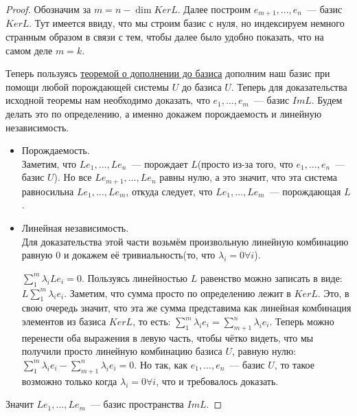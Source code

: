 \begin{proof}
    Обозначим за $m=n - \dim Ker L$.
    Далее построим $e_{m+1},\dots, e_n$~--- базис $Ker L$.
    Тут имеется ввиду, что мы строим базис с нуля, но индексируем немного странным
    образом в связи с тем, чтобы далее было удобно показать, что на самом деле $m = k$.

    Теперь пользуясь \hyperref[thm:О дополнении до базиса]{теоремой о дополнении до базиса}
    дополним наш базис
    при помощи любой порождающей системы $U$ до базиса $U$. Теперь для доказательства
    исходной теоремы нам необходимо доказать, что $e_1,\dots, e_m$~--- базис $Im L$.
    Будем делать это по определению, а именно докажем порождаемость и линейную независимость.

    \begin{itemize}
        \item Порождаемость.\\
            Заметим, что $Le_1,\dots,Le_n$~--- порождает $L$(просто из-за того, что $e_1,\dots,e_n$~--- базис $U$).
            Но все $Le_{m+1}, \dots, Le_n$ равны нулю, а это значит, что эта система равносильна
            $Le_1,\dots,Le_m$, откуда следует, что $Le_1,\dots, Le_m$~--- порождающая $L$.
        \item Линейная независимость.\\
            Для доказательства этой части возьмём произвольную линейную комбинацию равную 0 и докажем её 
            тривиальность(то, что $\lambda_i = 0 \forall i$).

            $\sum\limits_{1}^{m}{\lambda_i Le_i} = 0$. Пользуясь линейностью $L$ равенство можно записать
            в виде: $L\sum\limits_{1}^{m}{\lambda_ie_i}$. Заметим, что сумма просто по определению
            лежит в $Ker L$. Это, в свою очередь значит, что эта же сумма представима как линейная
            комбинация элементов из базиса $Ker L$, то есть:  
            $\sum\limits_{1}^{m}{\lambda_ie_i} = \sum\limits_{m+1}^{n}{\lambda_ie_i}$. 
            Теперь можно перенести оба выражения в левую часть, чтобы чётко видеть, что мы получили
            просто линейную комбинацию базиса $U$, равную нулю: 
            $\sum\limits_{1}^{m}{\lambda_ie_i} - \sum\limits_{m+1}^{n}{\lambda_ie_i} = 0$. 
            Но так, как $e_1,\dots, e_n$~--- базис $U$, то такое возможно только когда
            $\lambda_i = 0\forall i$, что и требовалось доказать.
    \end{itemize}
    Значит $Le_1,\dots,Le_m$~--- базис пространства $Im L$.
\end{proof}
